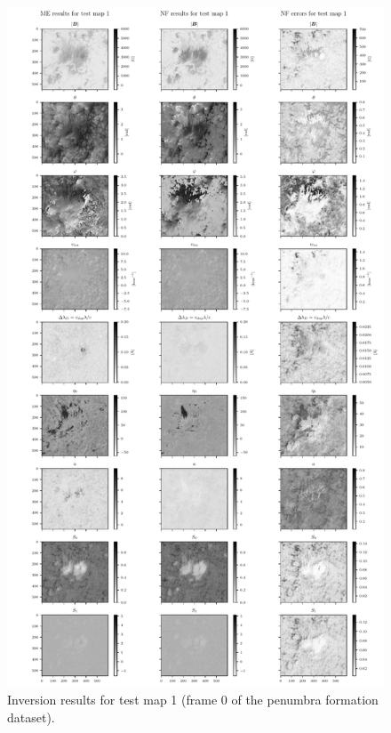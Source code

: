 \documentclass[a4paper,12pt]{report}
\begin{document}
\begin{figure}[h!]
\centering
\includegraphics[height=\textheight-1cm]{figures/nf-milne-eddington-example-4-nflows-piecewisequadratic-comp-ME-NF-testmap1.pdf}
\caption{Inversion results for test map 1 (frame 0 of the penumbra formation dataset).}
\label{fig:nf-milne-eddington-example-4-nflows-piecewisequadratic-comp-ME-NF-testmap1}
\end{figure}
\end{document}
